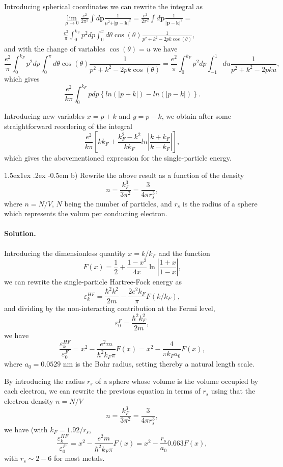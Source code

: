 \documentclass[%
oneside,                 %
final,                   %
10pt]{article}
\makeatletter
\newenvironment{doconceexercise}{}{}
\newcommand\subex{\@startsection{paragraph}{4}{\z@}%
                  {1.5ex\@plus1ex \@minus.2ex}%
                  {-0.5em}%
                  {\normalfont\normalsize\bfseries}}
\makeatother
\begin{document}
\begin{doconceexercise}
Introducing spherical coordinates we can rewrite the integral as 
\begin{align}
\lim_{\mu \to 0}\frac{e^{2}}{ 2\pi^2}  \int d\mathbf{p}\frac{1}{\mu^2+\vert \mathbf{p}-\mathbf{k}\vert^2}=\frac{e^{2}}{ 2\pi^2}  \int d\mathbf{p}\frac{1}{\vert \mathbf{p}-\mathbf{k}\vert^2}=& \\
\frac{e^{2}}{\pi}  \int_0^{k_F} p^2dp\int_0^{\pi} d\theta\cos{(\theta)}\frac{1}{p^2+k^2-2pk\cos{(\theta)}},
\end{align}
and with the change of variables $\cos{(\theta)}=u$ we have 
\[
\frac{e^{2}}{\pi}  \int_0^{k_F} p^2dp\int_{0}^{\pi} d\theta\cos{(\theta)}\frac{1}{p^2+k^2-2pk\cos{(\theta)}}=\frac{e^{2}}{\pi}  \int_0^{k_F} p^2dp\int_{-1}^{1} du\frac{1}{p^2+k^2-2pku},
\]
which gives
\[
\frac{e^{2}}{k\pi}  \int_0^{k_F} pdp\left\{ln(\vert p+k\vert)-ln(\vert p-k\vert)\right\}.
\]

Introducing new variables $x=p+k$ and $y=p-k$, we obtain after some straightforward reordering of the integral
\[
\frac{e^{2}}{k\pi}\left[
kk_F+\frac{k_{F}^{2}-k^{2}}{kk_{F}}ln\left\vert\frac{k+k_{F}}
{k-k_{F}}\right\vert
\right],
\]
which gives the abovementioned expression for the single-particle energy.


\subex{b)}
Rewrite the above result as a function of the density
\[
n= \frac{k_F^3}{3\pi^2}=\frac{3}{4\pi r_s^3},
\]
where $n=N/V$, $N$ being the number of particles, and $r_s$ is the radius of a sphere which represents the volum per conducting electron.


\paragraph{Solution.}
Introducing the dimensionless quantity $x=k/k_F$ and the function
\[
F(x) = \frac{1}{2}+\frac{1-x^2}{4x}\ln{\left\vert \frac{1+x}{1-x}\right\vert},
\]
we can rewrite the single-particle Hartree-Fock energy as 
\[
\varepsilon_{k}^{HF}=\frac{\hbar^{2}k^{2}}{2m}-\frac{2e^{2}
k_{F}}{\pi}F(k/k_F),
\]
and dividing by the non-interacting contribution at the Fermi level, 
\[
\varepsilon_{0}^{F}=\frac{\hbar^{2}k_F^{2}}{2m},
\]
we have
\[
\frac{\varepsilon_{k}^{HF} }{\varepsilon_{0}^{F}}=x^2-\frac{e^2m}{\hbar^2 k_F\pi}F(x)=x^2-\frac{4}{\pi k_Fa_0}F(x),
\]
where $a_0=0.0529$ nm is the Bohr radius, setting thereby a natural length scale. 


By introducing the radius $r_s$ of a sphere whose volume is the volume occupied by each electron, we can rewrite the previous equation in terms of $r_s$ using that the electron density $n=N/V$
\[
n=\frac{k_F^3}{3\pi^2} = \frac{3}{4\pi r_s^3},
\]
we have (with $k_F=1.92/r_s$,
\[
\frac{\varepsilon_{k}^{HF} }{\varepsilon_{0}^{F}}=x^2-\frac{e^2m}{\hbar^2 k_F\pi}F(x)=x^2-\frac{r_s}{a_0}0.663F(x),
\]
with $r_s \sim 2-6$ for most metals.


\end{doconceexercise}
\end{document}
